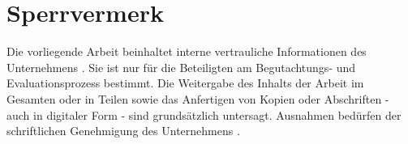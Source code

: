 \section*{Sperrvermerk}

\begin{center}
\end{center}

Die vorliegende Arbeit beinhaltet interne vertrauliche Informationen des Unternehmens \TheCompany.
Sie ist nur für die Beteiligten am Begutachtungs- und Evaluationsprozess bestimmt.
Die Weitergabe des Inhalts der Arbeit im Gesamten oder in Teilen sowie das Anfertigen von
Kopien oder Abschriften - auch in digitaler Form - sind grundsätzlich untersagt.
Ausnahmen bedürfen der schriftlichen Genehmigung des Unternehmens \TheCompany.